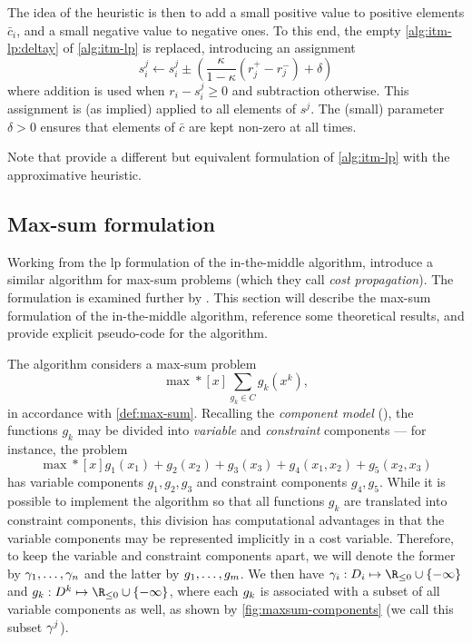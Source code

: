 The idea of the heuristic is then to add a small positive value to positive elements \(\bar{c}_i\), and a small negative value to negative ones.
To this end, the empty \cref{alg:itm-lp:deltay} of \cref{alg:itm-lp} is replaced, introducing an assignment
\begin{equation*}
	s^j_i \leftarrow s^j_i \pm \left(\frac{\kappa}{1-\kappa}(r^+_j - r^-_j) + \delta\right)
\end{equation*}
where addition is used when \(r_i - s^j_i \geq 0\) and subtraction otherwise.
This assignment is (as implied) applied to all elements of \(s^j\).
The (small) parameter \(\delta>0\) ensures that elements of \(\bar{c}\) are kept non-zero at all times.

Note that \textcite[\pno~97]{Bastert10} provide a different but equivalent formulation of \cref{alg:itm-lp} with the approximative heuristic.


\subsection{Max-sum formulation}
Working from the \gls{lp} formulation of the in-the-middle algorithm, \textcite{Wedelin08} introduce a similar algorithm for max-sum problems (which they call \emph{cost propagation}).
The formulation is examined further by \textcite[\pno~11\psqq]{Wedelin13}.
This section will describe the max-sum formulation of the in-the-middle algorithm, reference some theoretical results, and provide explicit pseudo-code for the algorithm.

The algorithm considers a max-sum problem
\begin{equation}\label{eq:maxsum}
	\max*[x] \sum_{g_k\in C} g_k(x^k),
\end{equation}
in accordance with \cref{def:max-sum}.
Recalling the \emph{component model} (), the functions \(g_k\) may be divided into \emph{variable} and \emph{constraint} components --- for instance, the problem
\begin{equation*}
	\max*[x] g_1(x_1) + g_2(x_2) + g_3(x_3) + g_4(x_1, x_2) + g_5(x_2, x_3)
\end{equation*}
has variable components \(g_1, g_2, g_3\) and constraint components \(g_4, g_5\).
While it is possible to implement the algorithm so that all functions \(g_k\) are translated into constraint components, this division has computational advantages in that the variable components may be represented implicitly in a cost variable.
Therefore, to keep the variable and constraint components apart, we will denote the former by \(\gamma_1,\dotsc,\gamma_n\) and the latter by \(g_1,\dotsc,g_m\).
We then have \(\vcomp_i : D_i \mapsto \Rminus \cup \{-\infty\}\) and \(\ccomp_k : D^k \mapsto \Rminus \cup \{-\infty\}\), where each \(g_k\) is associated with a subset of all variable components as well, as shown by \cref{fig:maxsum-components} (we call this subset \(\gamma^j\)).

